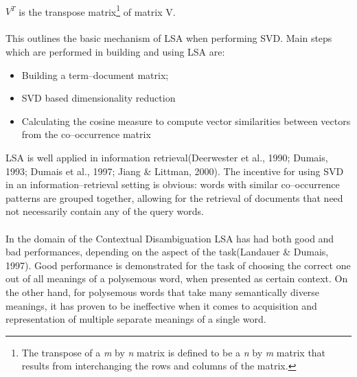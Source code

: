 \\\textbf{$V^{T}$} is the transpose matrix\footnote{The transpose of a \textit{m} by \textit{n} matrix is 
defined to be a \textit{n} by \textit{m} matrix that results from interchanging the rows and columns of the 
matrix.} of matrix V.
\\\\  This outlines the basic mechanism of LSA when performing SVD. Main steps which are performed in 
building and using LSA are:
\begin{itemize}
\item Building a term--document matrix;

\item SVD based dimensionality reduction
\item Calculating the cosine measure to compute vector similarities between vectors from the co--occurrence matrix 
\end{itemize}
LSA is well applied in information retrieval(Deerwester et al., 1990; Dumais, 1993; Dumais et al., 1997; Jiang \& Littman, 2000). The incentive for using SVD in an information--retrieval setting is obvious: words with similar co--occurrence patterns are grouped together, allowing for the retrieval of documents that need not necessarily contain any of the query words.
\\\\
In the domain of the Contextual Disambiguation LSA has had both good and bad performances, depending on the aspect of the task(Landauer \& Dumais, 1997). Good performance is demonstrated for the task of choosing the correct one out of all meanings of a polysemous word, when presented as certain context. On the other hand, for polysemous words that take many semantically diverse meanings, it has proven to be ineffective when it comes to acquisition
and representation of multiple separate meanings of a single word.
\newpage

